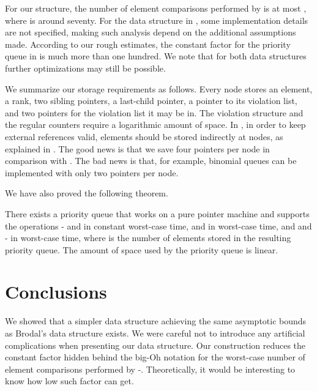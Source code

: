 \documentclass{llncs}
\newcommand{\Findmin}{\mbox{\mbox{\rm -}}}
\newcommand{\Insert}{\mbox{}}
\newcommand{\Deletemin}{\mbox{\mbox{\rm -}}}
\newcommand{\Decrease}{\mbox{}}
\newcommand{\Delete}{\mbox{}}
\newcommand{\Meld}{\mbox{}}
\begin{document}
For our structure, the number of element comparisons performed by
\Delete{} is at most , where  is around
seventy. For the data structure in \cite{Bro96}, some
implementation details are not specified, making such analysis depend on
the additional assumptions made.  According to our rough estimates,
the constant factor  for the priority queue in \cite{Bro96} is much more than
one hundred. We note that for both data structures further
optimizations may still be possible.

We summarize our storage requirements as follows. Every node stores an
element, a rank, two sibling pointers, a last-child pointer, a pointer
to its violation list, and two pointers for the violation list it may
be in. The violation structure and the regular counters require a logarithmic
amount of space.  In \cite{Bro96}, in order to keep external
references valid, elements should be stored indirectly at nodes, as
explained in \cite[Chapter 6]{CLRS09}.  The good news is that we save
four pointers per node in comparison with \cite{Bro96}. The bad news
is that, for example, binomial queues \cite{Vui78} can be implemented
with only two pointers per node.

We have also proved the following theorem.

\begin{theorem}
There exists a priority queue that works on a pure pointer machine and
supports the operations \Findmin{} and \Insert{} in constant
worst-case time, \Decrease{} and \Meld{} in  worst-case
time, and \Delete{} and \Deletemin{} in  worst-case time,
where  is the number of elements stored in the resulting priority
queue.  The amount of space used by the priority queue is linear.
\end{theorem}


\section{Conclusions}

We showed that a simpler data structure achieving the same asymptotic
bounds as Brodal's data structure \cite{Bro96} exists.  We were
careful not to introduce any artificial complications when presenting
our data structure.  Our construction reduces the constant factor
hidden behind the big-Oh notation for the worst-case number of element
comparisons performed by \Deletemin{}.  Theoretically, it would be
interesting to know how low such factor can get.
\end{document}
